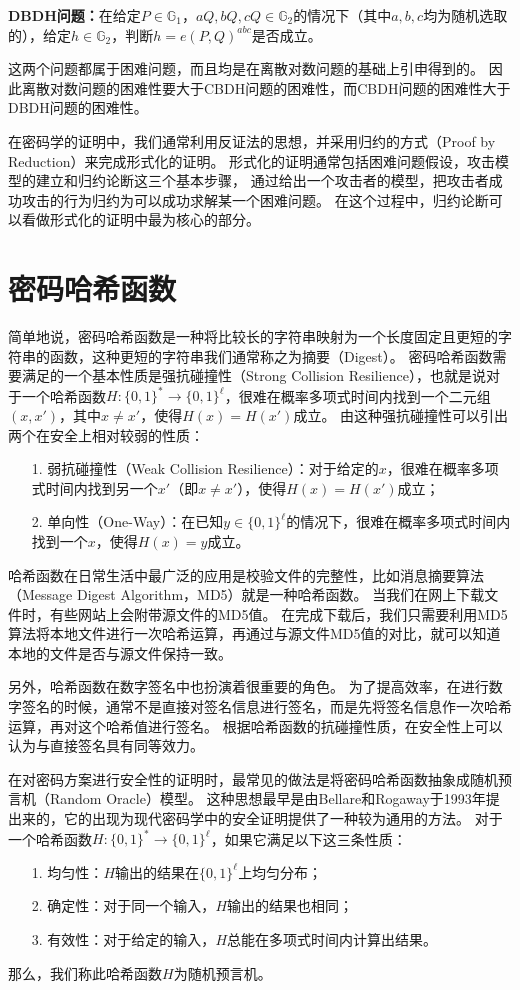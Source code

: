 \textbf{DBDH问题：}在给定$P\in\mathbb{G}_1$，$aQ,bQ,cQ\in\mathbb{G}_2$的情况下（其中$a,b,c$均为随机选取的），给定$h\in\mathbb{G}_2$，判断$h=e(P,Q)^{abc}$是否成立。

这两个问题都属于困难问题，而且均是在离散对数问题的基础上引申得到的。
因此离散对数问题的困难性要大于CBDH问题的困难性，而CBDH问题的困难性大于DBDH问题的困难性。

在密码学的证明中，我们通常利用反证法的思想，并采用归约的方式（Proof by Reduction）来完成形式化的证明。
形式化的证明通常包括困难问题假设，攻击模型的建立和归约论断这三个基本步骤，
通过给出一个攻击者的模型，把攻击者成功攻击的行为归约为可以成功求解某一个困难问题。
在这个过程中，归约论断可以看做形式化的证明中最为核心的部分。

\section{密码哈希函数}

简单地说，密码哈希函数是一种将比较长的字符串映射为一个长度固定且更短的字符串的函数，这种更短的字符串我们通常称之为摘要（Digest）。
密码哈希函数需要满足的一个基本性质是强抗碰撞性（Strong Collision Resilience），也就是说对于一个哈希函数$H:\{0,1\}^*\rightarrow \{0,1\}^\ell$，很难在概率多项式时间内找到一个二元组$(x,x')$，其中$x\neq x'$，使得$H(x)=H(x')$成立。
由这种强抗碰撞性可以引出两个在安全上相对较弱的性质：

\begin{itemize}
  \item[1.] 弱抗碰撞性（Weak Collision Resilience）：对于给定的$x$，很难在概率多项式时间内找到另一个$x'$（即$x\neq x'$），使得$H(x)=H(x')$成立；
  \item[2.] 单向性（One-Way）：在已知$y\in \{0,1\}^\ell$的情况下，很难在概率多项式时间内找到一个$x$，使得$H(x)=y$成立。
\end{itemize}

哈希函数在日常生活中最广泛的应用是校验文件的完整性，比如消息摘要算法（Message Digest Algorithm，MD5）就是一种哈希函数。
当我们在网上下载文件时，有些网站上会附带源文件的MD5值。
在完成下载后，我们只需要利用MD5算法将本地文件进行一次哈希运算，再通过与源文件MD5值的对比，就可以知道本地的文件是否与源文件保持一致。

另外，哈希函数在数字签名中也扮演着很重要的角色。
为了提高效率，在进行数字签名的时候，通常不是直接对签名信息进行签名，而是先将签名信息作一次哈希运算，再对这个哈希值进行签名。
根据哈希函数的抗碰撞性质，在安全性上可以认为与直接签名具有同等效力。

在对密码方案进行安全性的证明时，最常见的做法是将密码哈希函数抽象成随机预言机（Random Oracle）模型。
这种思想最早是由Bellare和Rogaway于1993年提出来的\cite{bellare1993random}，它的出现为现代密码学中的安全证明提供了一种较为通用的方法。
对于一个哈希函数$H:\{0,1\}^*\rightarrow\{0,1\}^\ell$，如果它满足以下这三条性质：
\begin{itemize}
  \item[1.] 均匀性：$H$输出的结果在$\{0,1\}^\ell$上均匀分布；
  \item[2.] 确定性：对于同一个输入，$H$输出的结果也相同；
  \item[3.] 有效性：对于给定的输入，$H$总能在多项式时间内计算出结果。
\end{itemize}
那么，我们称此哈希函数$H$为随机预言机。

